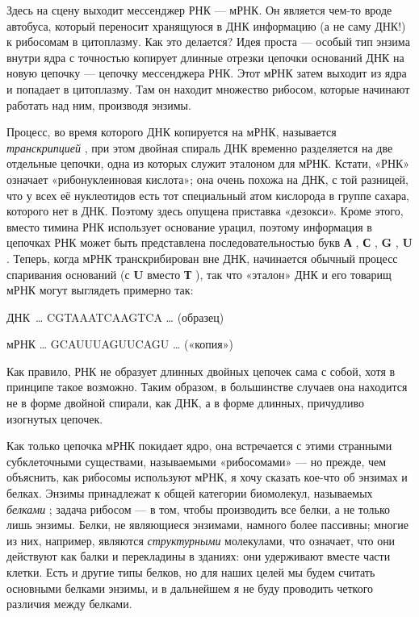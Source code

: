 \documentclass[../main.tex]{subfiles}
\begin{document}
Здесь на сцену выходит мессенджер РНК --- мРНК\@. Он является чем-то вроде автобуса, который переносит хранящуюся в ДНК информацию (а не саму ДНК!) к рибосомам в цитоплазму. Как это делается? Идея проста --- особый тип энзима внутри ядра с точностью копирует длинные отрезки цепочки оснований ДНК на новую цепочку --- цепочку мессенджера РНК\@. Этот мРНК затем выходит из ядра и попадает в цитоплазму. Там он находит множество рибосом, которые начинают работать над ним, производя энзимы.

Процесс, во время которого ДНК копируется на мРНК, называется \emph{транскрипцией} , при этом двойная спираль ДНК временно разделяется на две отдельные цепочки, одна из которых служит эталоном для мРНК\@. Кстати, «РНК» означает «рибонуклеиновая кислота»; она очень похожа на ДНК, с той разницей, что у всех её нуклеотидов есть тот специальный атом кислорода в группе сахара, которого нет в ДНК\@. Поэтому здесь опущена приставка «дезокси». Кроме этого, вместо тимина РНК использует основание урацил, поэтому информация в цепочках РНК может быть представлена последовательностью букв \textbf{А} , \textbf{С} , \textbf{G} , \textbf{U} . Теперь, когда мРНК транскрибирован вне ДНК, начинается обычный процесс спаривания оснований (с \textbf{U} вместо \textbf{Т} ), так что «эталон» ДНК и его товарищ мРНК могут выглядеть примерно так:

ДНК~\ldots{} CGTAAATCAAGTCA \ldots{} (образец)

мРНК \ldots{} GCAUUUAGUUCAGU \ldots{} («копия»)

Как правило, РНК не образует длинных двойных цепочек сама с собой, хотя в принципе такое возможно. Таким образом, в большинстве случаев она находится не в форме двойной спирали, как ДНК, а в форме длинных, причудливо изогнутых цепочек.

Как только цепочка мРНК покидает ядро, она встречается с этими странными субклеточными существами, называемыми «рибосомами» --- но прежде, чем объяснить, как рибосомы используют мРНК, я хочу сказать кое-что об энзимах и белках. Энзимы принадлежат к общей категории биомолекул, называемых \emph{белками} ; задача рибосом --- в том, чтобы производить все белки, а не только лишь энзимы. Белки, не являющиеся энзимами, намного более пассивны; многие из них, например, являются \emph{структурными} молекулами, что означает, что они действуют как балки и перекладины в зданиях: они удерживают вместе части клетки. Есть и другие типы белков, но для наших целей мы будем считать основными белками энзимы, и в дальнейшем я не буду проводить четкого различия между белками.
\end{document}
